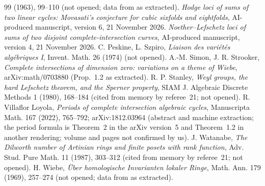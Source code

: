 \documentclass[11pt]{article}
\numberwithin{equation}{section}
\theoremstyle{remark}
\begin{document}
\begin{thebibliography}{99}
(1963), 99--110 (not opened; data from \cite{CPV} as extracted).
 \emph{Hodge loci of sums of two linear cycles: Movasati's conjecture for cubic sixfolds and
eightfolds}, AI-produced manuscript, version 6, 21 November 2026.
 \emph{Noether--Lefschetz loci of sums of two disjoint complete-intersection curves}, AI-produced
manuscript, version 4, 21 November 2026.
 C. Peskine, L. Szpiro, \emph{Liaison des vari\'et\'es alg\'ebriques I}, Invent. Math. 26 (1974)
(not opened).
 A.-M. Simon, J. R. Strooker, \emph{Complete intersections of dimension zero: variations on a theme
of Wiebe}, arXiv:math/0703880 (Prop.~1.2 as extracted).
 R. P. Stanley, \emph{Weyl groups, the hard Lefschetz theorem, and the Sperner property}, SIAM J.
Algebraic Discrete Methods 1 (1980), 168--184 (cited from memory by referee~21; not opened).
 R. Villaflor Loyola, \emph{Periods of complete intersection algebraic cycles}, Manuscripta Math.
167 (2022), 765--792; arXiv:1812.03964 (abstract and machine extraction; the period formula is Theorem~2 in the
arXiv version~5 and Theorem~1.2 in another rendering; volume and pages not confirmed by us).
 J. Watanabe, \emph{The Dilworth number of Artinian rings and finite posets with rank function},
Adv. Stud. Pure Math. 11 (1987), 303--312 (cited from memory by referee~21; not opened).
 H. Wiebe, \emph{\"Uber homologische Invarianten lokaler Ringe}, Math. Ann. 179 (1969), 257--274
(not opened; data from \cite{SS} as extracted).
\end{thebibliography}
\end{document}
